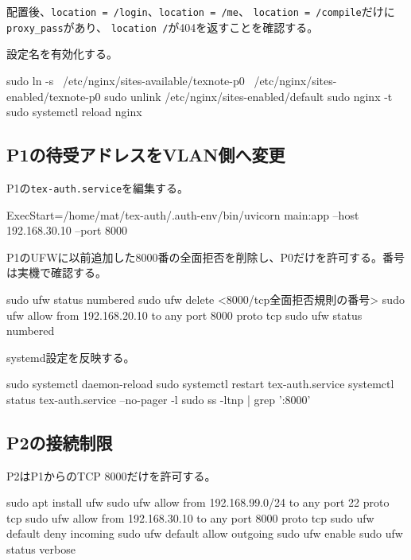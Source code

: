 \documentclass[uplatex,a4paper,11pt]{jsarticle}
\begin{document}
配置後、\texttt{location = /login}、\texttt{location = /me}、
\texttt{location = /compile}だけに\texttt{proxy\_pass}があり、
\texttt{location /}が404を返すことを確認する。

設定名を有効化する。

\begin{command}
sudo ln -s \
  /etc/nginx/sites-available/texnote-p0 \
  /etc/nginx/sites-enabled/texnote-p0
sudo unlink /etc/nginx/sites-enabled/default
sudo nginx -t
sudo systemctl reload nginx
\end{command}

\subsection{P1の待受アドレスをVLAN側へ変更}

P1の\texttt{tex-auth.service}を編集する。

\begin{command}
ExecStart=/home/mat/tex-auth/.auth-env/bin/uvicorn main:app --host 192.168.30.10 --port 8000
\end{command}

P1のUFWに以前追加した8000番の全面拒否を削除し、P0だけを許可する。番号は実機で確認する。

\begin{command}
sudo ufw status numbered
sudo ufw delete <8000/tcp全面拒否規則の番号>
sudo ufw allow from 192.168.20.10 to any port 8000 proto tcp
sudo ufw status numbered
\end{command}

systemd設定を反映する。

\begin{command}
sudo systemctl daemon-reload
sudo systemctl restart tex-auth.service
systemctl status tex-auth.service --no-pager -l
sudo ss -ltnp | grep ':8000'
\end{command}

\subsection{P2の接続制限}

P2はP1からのTCP 8000だけを許可する。

\begin{command}
sudo apt install ufw
sudo ufw allow from 192.168.99.0/24 to any port 22 proto tcp
sudo ufw allow from 192.168.30.10 to any port 8000 proto tcp
sudo ufw default deny incoming
sudo ufw default allow outgoing
sudo ufw enable
sudo ufw status verbose
\end{command}
\end{document}
